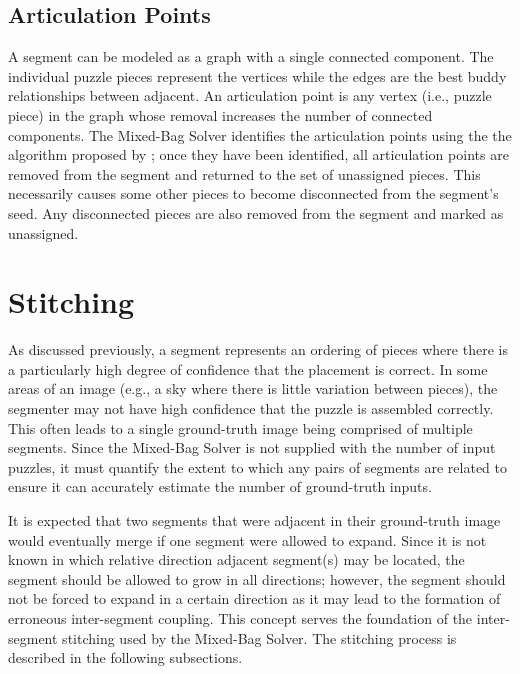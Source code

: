 \subsection{Articulation Points}\label{sec:ArticulationPoints}

A segment can be modeled as a graph with a single connected component.  The individual puzzle pieces represent the vertices while the edges are the best buddy relationships between adjacent.  An articulation point is any vertex (i.e., puzzle piece) in the graph whose removal increases the number of connected components.  The Mixed-Bag Solver identifies the articulation points using the the algorithm proposed by \cite{cormenIntroToAlgorithms}; once they have been identified, all articulation points are removed from the segment and returned to the set of unassigned pieces.  This necessarily causes some other pieces to become disconnected from the segment's seed.  Any disconnected pieces are also removed from the segment and marked as unassigned.  

\section{Stitching}\label{sec:stitching}

As discussed previously, a segment represents an ordering of pieces where there is a particularly high degree of confidence that the placement is correct.  In some areas of an image (e.g., a sky where there is little variation between pieces), the segmenter may not have high confidence that the puzzle is assembled correctly.  This often leads to a single ground-truth image being comprised of multiple segments. Since the Mixed-Bag Solver is not supplied with the number of input puzzles, it must quantify the extent to which any pairs of segments are related to ensure it can accurately estimate the number of ground-truth inputs.  

It is expected that two segments that were adjacent in their ground-truth image would eventually merge if one segment were allowed to expand. Since it is not known in which relative direction adjacent segment(s) may be located, the segment should be allowed to grow in all directions; however, the segment should not be forced to expand in a certain direction as it may lead to the formation of erroneous inter-segment coupling.  This concept serves the foundation of the inter-segment stitching used by the Mixed-Bag Solver.  The stitching process is described in the following subsections.

